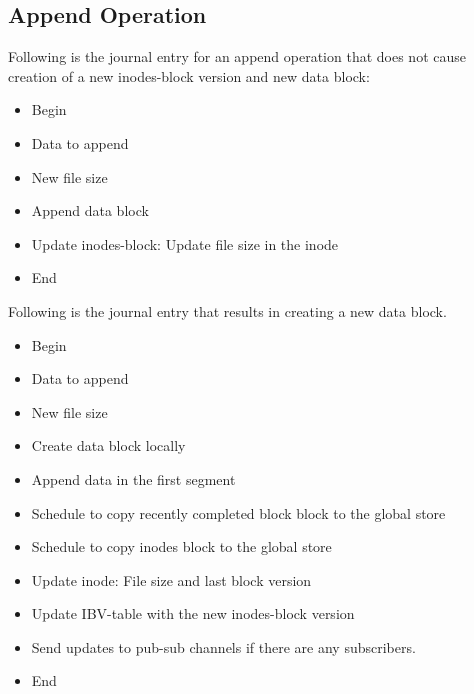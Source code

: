 \documentclass[]{article}
\begin{document}
\subsection{Append Operation}

Following is the journal entry for an append operation that does not cause creation
of a new inodes-block version and new data block:

\begin{itemize}

\item Begin
\item Data to append
\item New file size
\item Append data block
\item Update inodes-block: Update file size in the inode
\item End

\end{itemize}


Following is the journal entry that results in creating a new data block.

\begin{itemize}

\item Begin
\item Data to append
\item New file size
\item Create data block locally
\item Append data in the first segment
\item Schedule to copy recently completed block block to the global store
\item Schedule to copy inodes block to the global store
\item Update inode: File size and last block version
\item Update IBV-table with the new inodes-block version
\item Send updates to pub-sub channels if there are any subscribers.
\item End

\end{itemize}


%
%
\end{document}
